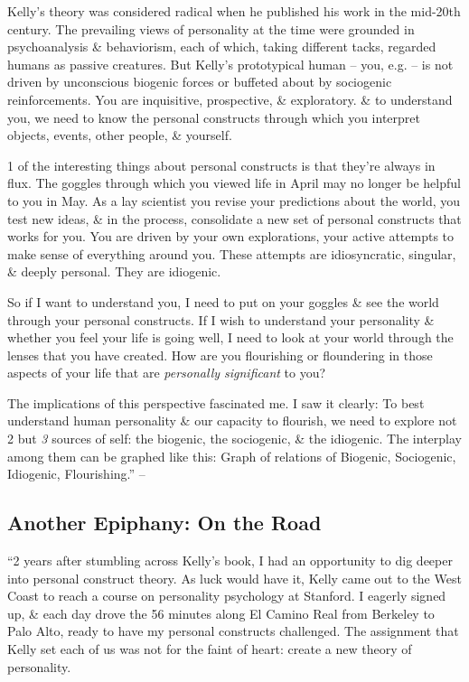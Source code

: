 \documentclass{article}
\numberwithin{equation}{section}
\begin{document}
Kelly's theory was considered radical when he published his work in the mid-20th century. The prevailing views of personality at the time were grounded in psychoanalysis \& behaviorism, each of which, taking different tacks, regarded humans as passive creatures. But Kelly's prototypical human -- you, e.g. -- is not driven by unconscious biogenic forces or buffeted about by sociogenic reinforcements. You are inquisitive, prospective, \& exploratory. \& to understand you, we need to know the personal constructs through which you interpret objects, events, other people, \& yourself.

1 of the interesting things about personal constructs is that they're always in flux. The goggles through which you viewed life in April may no longer be helpful to you in May. As a lay scientist you revise your predictions about the world, you test new ideas, \& in the process, consolidate a new set of personal constructs that works for you. You are driven by your own explorations, your active attempts to make sense of everything around you. These attempts are idiosyncratic, singular, \& deeply personal. They are idiogenic.

So if I want to understand you, I need to put on your goggles \& see the world through your personal constructs. If I wish to understand your personality \& whether you feel your life is going well, I need to look at your world through the lenses that you have created. How are you flourishing or floundering in those aspects of your life that are \textit{personally significant} to you?

The implications of this perspective fascinated me. I saw it clearly: To best understand human personality \& our capacity to flourish, we need to explore not 2 but \textit{3} sources of self: the biogenic, the sociogenic, \& the idiogenic. The interplay among them can be graphed like this: \textsf{Graph of relations of Biogenic, Sociogenic, Idiogenic, Flourishing}.'' -- \cite[pp. 23--25]{Little2017}

\subsection{Another Epiphany: On the Road}
``2 years after stumbling across Kelly's book, I had an opportunity to dig deeper into personal construct theory. As luck would have it, Kelly came out to the West Coast to reach a course on personality psychology at Stanford. I eagerly signed up, \& each day drove the 56 minutes along El Camino Real from Berkeley to Palo Alto, ready to have my personal constructs challenged. The assignment that Kelly set each of us was not for the faint of heart: create a new theory of personality.
\end{document}
